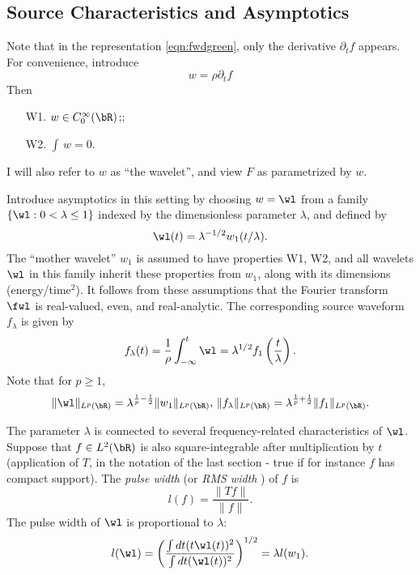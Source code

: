 \subsection{Source Characteristics and Asymptotics}

Note that in the representation \ref{eqn:fwdgreen}, only the
derivative $\partial_tf$ appears. For convenience, introduce
\begin{equation}
  \label{eqn:wavelet}
  w = \rho \partial_t f
\end{equation}
Then
\begin{itemize}
\item[W1. ] $w \in C^{\infty}_0(\bR)$;;
\item[W2. ] $\int \, w = 0$.
\end{itemize}
I will also
refer to $w$ as ``the wavelet'', and view $F$ as parametrized by $w$.

Introduce asymptotics in this setting by choosing $w = \wl$
from a family $\{\wl:0 <\lambda \le 1\}$ indexed by the dimensionless parameter
$\lambda$, and defined by
\begin{equation}
  \label{eqn:wfam}
  \wl(t) = \lambda^{-1/2}w_1(t/\lambda).
\end{equation}
The  ``mother wavelet'' $w_1$ is assumed to have properties W1, W2, and
all wavelets $\wl$ in this family
inherit these properties from $w_1$, along with its dimensions
(energy/time$^2$). It follows from these assumptions that the Fourier transform $\fwl$ is
real-valued, even, and real-analytic. The corresponding source waveform $f_{\lambda}$ is
given by
\begin{equation}
  \label{eqn:flambda}
  f_{\lambda}(t) =\frac{1}{\rho} \int_{-\infty}^t\wl =
  \lambda^{1/2}f_1\left(\frac{t}{\lambda}\right).
\end{equation}
Note that for $p \ge 1$,
\begin{equation}
  \label{eqn:lambdanorms}
  \|\wl\|_{L^p(\bR)} = \lambda ^{\frac{1}{p}-\frac{1}{2}}\|w_1\|_{L^p(\bR)},\,\|f_{\lambda}\|_{L^p(\bR)}
  = \lambda ^{\frac{1}{p}+\frac{1}{2}} \|f_1\|_{L^p(\bR)}.
\end{equation}


The parameter $\lambda$ is connected to several frequency-related
characteristics of $\wl$. Suppose that $f \in L^2(\bR)$ is also square-integrable after
multiplication by $t$ (application of $T$, in the notation of the last
section - true if for instance $f$ has compact
support). The {\em pulse width} (or {\em RMS width} ) of $f$ is
\begin{equation}
  \label{eqn:pw}
  l(f) = \frac{\|Tf\|}{\|f\|}.
\end{equation}
The pulse width of $\wl$ is proportional to $\lambda$:
\begin{equation}
  \label{eqn:wpw}
  l(\wl) = \left(\frac{\int dt (t \wl(t))^2}{\int dt (\wl(t))^2}
  \right)^{1/2} = \lambda l(w_1).
\end{equation}

